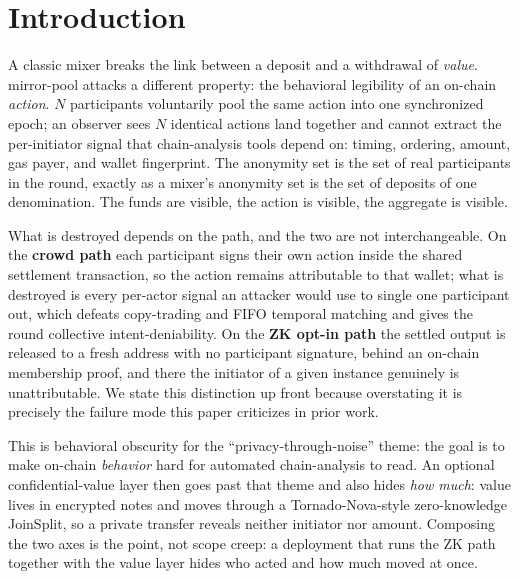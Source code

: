 \documentclass[10pt]{article}
\begin{document}
\section{Introduction}

A classic mixer breaks the link between a deposit and a withdrawal of
\emph{value}. mirror-pool attacks a different property: the behavioral legibility
of an on-chain \emph{action}. $N$ participants voluntarily pool the same action
into one synchronized epoch; an observer sees $N$ identical actions land together
and cannot extract the per-initiator signal that chain-analysis tools depend on:
timing, ordering, amount, gas payer, and wallet fingerprint. The anonymity set is
the set of real participants in the round, exactly as a mixer's anonymity set is
the set of deposits of one denomination. The funds are visible, the action is
visible, the aggregate is visible.

What is destroyed depends on the path, and the two are not interchangeable. On the
\textbf{crowd path} each participant signs their own action inside the shared
settlement transaction, so the action remains attributable to that wallet; what is
destroyed is every per-actor signal an attacker would use to single one
participant out, which defeats copy-trading and FIFO temporal matching and gives
the round collective intent-deniability. On the \textbf{ZK opt-in path} the
settled output is released to a fresh address with no participant signature,
behind an on-chain membership proof, and there the initiator of a given instance
genuinely is unattributable. We state this distinction up front because
overstating it is precisely the failure mode this paper criticizes in prior work.

This is behavioral obscurity for the ``privacy-through-noise'' theme: the goal is
to make on-chain \emph{behavior} hard for automated chain-analysis to read. An
optional confidential-value layer then goes past that theme and also hides
\emph{how much}: value lives in encrypted notes and moves through a
Tornado-Nova-style zero-knowledge JoinSplit, so a private transfer reveals
neither initiator nor amount. Composing the two axes is the point, not scope
creep: a deployment that runs the ZK path together with the value layer hides who
acted and how much moved at once.
\end{document}

